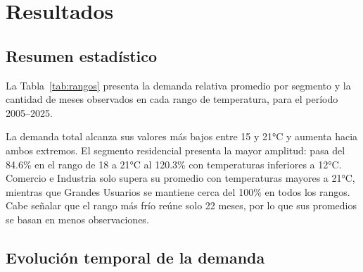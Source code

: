 \documentclass[10pt,a4paper]{article}
\begin{document}
\section{Resultados}

\subsection{Resumen estadístico}
La Tabla~\ref{tab:rangos} presenta la demanda relativa promedio por segmento y la cantidad de meses observados en cada rango de temperatura, para el período 2005--2025.

\begin{table}[h]
  \centering
  \caption{Demanda relativa promedio (\% del promedio anual) según rango de temperatura.}
  \label{tab:rangos}
\end{table}

La demanda total alcanza sus valores más bajos entre 15 y 21°C y aumenta hacia ambos extremos. El segmento residencial presenta la mayor amplitud: pasa del 84.6\% en el rango de 18 a 21°C al 120.3\% con temperaturas inferiores a 12°C. Comercio e Industria solo supera su promedio con temperaturas mayores a 21°C, mientras que Grandes Usuarios se mantiene cerca del 100\% en todos los rangos. Cabe señalar que el rango más frío reúne solo 22 meses, por lo que sus promedios se basan en menos observaciones.

\subsection{Evolución temporal de la demanda}
\end{document}
